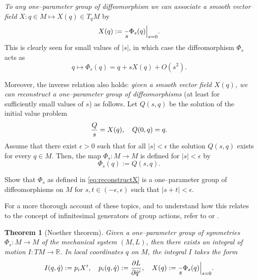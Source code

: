 \documentclass[english,fontsize=11pt,paper=a5,oneside]{scrbook}
\newcommand{\R}{\mathbb{R}}
\let\d\relax
\newcommand{\d}{\mathrm{d}}
\newtheorem{theorem}{Theorem}[chapter]
\theoremstyle{definition}
\newenvironment{remark}
  {\pushQED{\qed}\renewcommand{\qedsymbol}{$\lozenge$}\remarkx}
  {\popQED\endremarkx}
\newenvironment{exercise}
  {\pushQED{\qed}\renewcommand{\qedsymbol}{$\maltese$}\exercisex}
  {\popQED\endexercisex}
\begin{document}
\begin{remark}
  \emph{To any one--parameter group of diffeomorphism we can associate a smooth vector field $X : q\in M \mapsto X(q)\in T_qM$} by
  \begin{equation}
    X(q) := \frac{\d}{\d s} \Phi_s(q) \Big|_{s=0}.
  \end{equation}
  This is clearly seen for small values of $|s|$, in which case the diffeomorphism $\Phi_s$ acts as
  \begin{equation}\label{eq:infinitesimalSymmetryExp}
    q \mapsto \Phi_s(q) = q + s X(q) + O(s^2).
  \end{equation}

  Moreover, the inverse relation also holds: \emph{given a smooth vector field $X(q)$, we can reconstruct a one--parameter group of diffeomorphisms} (at least for sufficiently small values of $s$) as follows.
  Let $Q(s, q)$ be the solution of the initial value problem
  \begin{equation}\label{eq:NoetherCoords}
    \frac{\d Q}{\d s} = X(q), \quad Q(0, q) = q.
  \end{equation}
  Assume that there exist $\epsilon >0$ such that for all $|s|<\epsilon$ the solution $Q(s,q)$ exists for every $q\in M$.
  Then, the map $\Phi_s:M\to M$ is defined for $|s|<\epsilon$ by
  \begin{equation}\label{eq:reconstructX}
    \Phi_s(q) := Q(s, q).
  \end{equation}

  \begin{exercise}
    Show that $\Phi_s$ as defined in \eqref{eq:reconstructX} is a one--parameter group of diffeomorphisms on $M$ for $s,t \in(-\epsilon,\epsilon)$ such that $|s + t| < \epsilon$.
  \end{exercise}

  For a more thorough account of these topics, and to understand how this relates to the concept of infinitesimal generators of group actions, refer to \cite[Chapters 9 and 20]{book:lee} or \cite[Chapters 3 and 4]{lectures:aom:seri}.
\end{remark}

\begin{theorem}[Noether theorem]\label{thm:noether}
  Given a one--parameter group of symmetries $\Phi_s: M \to M$ of the mechanical system $(M,L)$, then there exists an integral of motion $I: TM \to \R$.
  In local coordinates $q$ on $M$, the integral $I$ takes the form
  \begin{equation}
    I(q,\dot q) := p_i X^i,
    \quad p_i(q, \dot q) := \frac{\partial L}{\partial \dot q^i},
    \quad X(q) := \frac{\d}{\d s} \Phi_s(q) \Big|_{s=0}.
  \end{equation}
\end{theorem}
\end{document}
